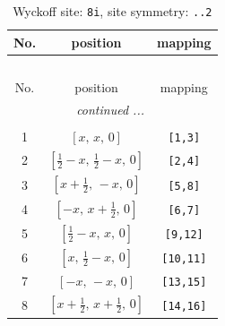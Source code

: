 \documentclass[fleqn,8pt]{jsarticle}
\begin{document}
\renewcommand{\arraystretch}{1.2}
\begin{longtable}{ccc}
\caption{Wyckoff site: {\tt 8i}, site symmetry: {\tt ..2}}
 \\
 \hline \hline
No. & position & mapping \\ \hline \endfirsthead

\multicolumn{2}{l}{\tablename\ \thetable{}} \\
 \hline \hline
No. & position & mapping \\ \hline \endhead

 \hline \hline
\multicolumn{2}{r}{\footnotesize\it continued ...} \\ \endfoot

 \hline \hline
\multicolumn{2}{r}{} \\ \endlastfoot

1 & $\left[ x,\, x,\, 0 \right]$ & {\tt [1,3]} \\ \hline
2 & $\left[ \frac{1}{2} - x,\, \frac{1}{2} - x,\, 0 \right]$ & {\tt [2,4]} \\ \hline
3 & $\left[ x + \frac{1}{2},\, - x,\, 0 \right]$ & {\tt [5,8]} \\ \hline
4 & $\left[ - x,\, x + \frac{1}{2},\, 0 \right]$ & {\tt [6,7]} \\ \hline
5 & $\left[ \frac{1}{2} - x,\, x,\, 0 \right]$ & {\tt [9,12]} \\ \hline
6 & $\left[ x,\, \frac{1}{2} - x,\, 0 \right]$ & {\tt [10,11]} \\ \hline
7 & $\left[ - x,\, - x,\, 0 \right]$ & {\tt [13,15]} \\ \hline
8 & $\left[ x + \frac{1}{2},\, x + \frac{1}{2},\, 0 \right]$ & {\tt [14,16]} \\
\end{longtable}
\renewcommand{\arraystretch}{1.2}
\end{document}
